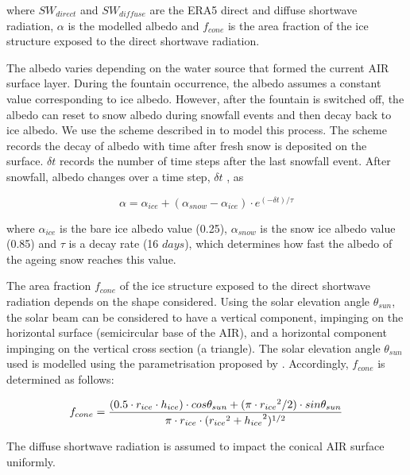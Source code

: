 \documentclass[utf8]{frontiersSCNS} %
\begin{document}
where $SW_{direct}$ and $SW_{diffuse}$ are the ERA5 direct and diffuse shortwave radiation, $\alpha$ is the modelled
albedo and $f_{cone}$ is the area fraction of the ice structure exposed to the direct shortwave radiation.

The albedo varies depending on the water source that formed the current AIR surface layer. During the fountain
occurrence, the albedo assumes a constant value corresponding to ice albedo. However, after the fountain is
switched off, the albedo can reset to snow albedo during snowfall events and then decay back to ice albedo. We use
the scheme described in \cite{OerlemansKnap_1998} to model this process. The scheme records the decay of albedo
with time after fresh snow is deposited on the surface. $\delta t$ records the number of time steps after the last
snowfall event. After snowfall, albedo changes over a time step, $\delta t$ , as

\begin{equation} \alpha=\alpha_{ice}+(\alpha_{snow}-\alpha_{ice}) \cdot e^{(-\delta t)/\tau} \label{eqn:a}
\end{equation}

where $\alpha_{ice}$ is the bare ice albedo value (0.25), $\alpha_{snow}$ is the snow ice albedo value (0.85) and $\tau$
is a decay rate (16 $days$), which determines how fast the albedo of the ageing snow reaches this value.

The area fraction $f_{cone}$ of the ice structure exposed to the direct shortwave radiation depends on the shape
considered. Using the solar elevation angle $\theta_{sun}$, the solar beam can be considered to have a vertical
component, impinging on the horizontal surface (semicircular base of the AIR), and a horizontal component impinging on
the vertical cross section (a triangle). The solar elevation angle $\theta_{sun}$ used is modelled using the
parametrisation proposed by \cite{Woolf_1968}. Accordingly, $f_{cone}$ is determined as follows:

\begin{equation} \begin{split} f_{cone}& =\frac{(0.5 \cdot r_{ice} \cdot h_{ice}) \cdot cos \theta_{sun} +(\pi \cdot
			{r_{ice}}^2/2) \cdot sin \theta_{sun} }{\pi \cdot r_{ice} \cdot ({r_{ice}}^2+{h_{ice}}^2)^{1/2}}\\ \end{split}
	\label{eqn:f_{cone}} \end{equation}

The diffuse shortwave radiation is assumed to impact the conical AIR surface uniformly.
\end{document}
